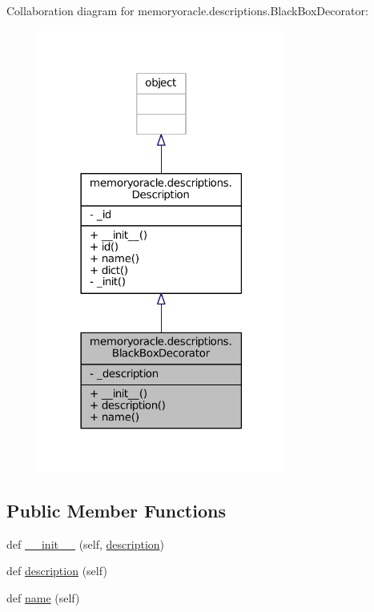 Collaboration diagram for memoryoracle.\+descriptions.\+Black\+Box\+Decorator\+:\nopagebreak
\begin{figure}[H]
\begin{center}
\leavevmode
\includegraphics[width=230pt]{classmemoryoracle_1_1descriptions_1_1BlackBoxDecorator__coll__graph}
\end{center}
\end{figure}
\subsection*{Public Member Functions}
\begin{DoxyCompactItemize}
\item 
def \hyperlink{classmemoryoracle_1_1descriptions_1_1BlackBoxDecorator_a157ba0e67a4972c5b9008c36c6127004}{\+\_\+\+\_\+init\+\_\+\+\_\+} (self, \hyperlink{classmemoryoracle_1_1descriptions_1_1BlackBoxDecorator_a558c1ce5d38dc4785d4ef36c0a053967}{description})
\item 
def \hyperlink{classmemoryoracle_1_1descriptions_1_1BlackBoxDecorator_a558c1ce5d38dc4785d4ef36c0a053967}{description} (self)
\item 
def \hyperlink{classmemoryoracle_1_1descriptions_1_1BlackBoxDecorator_a30f3fcba004264fb8b1c4e625a348124}{name} (self)
\end{DoxyCompactItemize}
